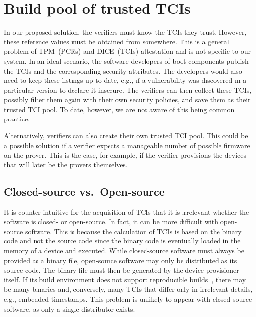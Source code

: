 \section{Build pool of trusted TCIs}

In our proposed solution, the verifiers must know the TCIs they trust.
However, these reference values must be obtained from somewhere.
This is a general problem of TPM~(PCRs) and DICE~(TCIs) attestation and is not specific to our system.
In an ideal scenario, the software developers of boot components publish the TCIs and the corresponding security attributes.
The developers would also need to keep these listings up to date, e.g., if a vulnerability was discovered in a particular version to declare it insecure.
The verifiers can then collect these TCIs, possibly filter them again with their own security policies, and save them as their trusted TCI pool.
To date, however, we are not aware of this being common practice.

Alternatively, verifiers can also create their own trusted TCI pool.
This could be a possible solution if a verifier expects a manageable number of possible firmware on the prover.
This is the case, for example, if the verifier provisions the devices that will later be the provers themselves.

\subsection{Closed-source vs.\ Open-source}

It is counter-intuitive for the acquisition of TCIs that it is irrelevant whether the software is closed- or open-source.
In fact, it can be more difficult with open-source software.
This is because the calculation of TCIs is based on the binary code and not the source code since the binary code is eventually loaded in the memory of a device and executed.
While closed-source software must always be provided as a binary file, open-source software may only be distributed as its source code.
The binary file must then be generated by the device provisioner itself.
If its build environment does not support reproducible builds~\cite{Lamb2022}, there may be many binaries and, conversely, many TCIs that differ only in irrelevant details, e.g., embedded timestamps.
This problem is unlikely to appear with closed-source software, as only a single distributor exists.

